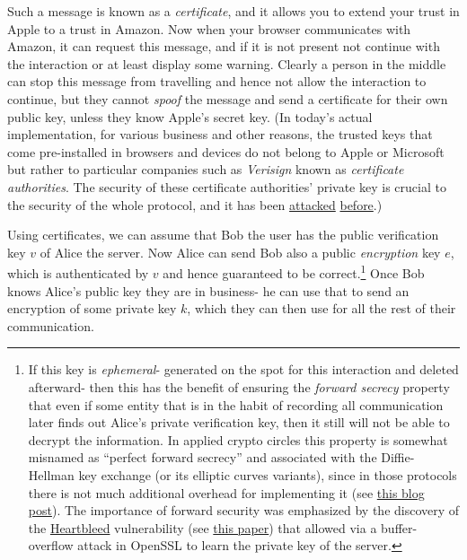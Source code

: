 Such a message is known as a \emph{certificate}, and it allows you to
extend your trust in Apple to a trust in Amazon. Now when your browser
communicates with Amazon, it can request this message, and if it is not
present not continue with the interaction or at least display some
warning. Clearly a person in the middle can stop this message from
travelling and hence not allow the interaction to continue, but they
cannot \emph{spoof} the message and send a certificate for their own
public key, unless they know Apple's secret key. (In today's actual
implementation, for various business and other reasons, the trusted keys
that come pre-installed in browsers and devices do not belong to Apple
or Microsoft but rather to particular companies such as \emph{Verisign}
known as \emph{certificate authorities}. The security of these
certificate authorities' private key is crucial to the security of the
whole protocol, and it has been
\href{https://en.wikipedia.org/wiki/DigiNotar}{attacked}
\href{http://www.wired.com/2011/10/son-of-stuxnet-in-the-wild/}{before}.)

Using certificates, we can assume that Bob the user has the public
verification key \(v\) of Alice the server. Now Alice can send Bob also
a public \emph{encryption} key \(e\), which is authenticated by \(v\)
and hence guaranteed to be correct.\footnote{If this key is
  \emph{ephemeral}- generated on the spot for this interaction and
  deleted afterward- then this has the benefit of ensuring the
  \emph{forward secrecy} property that even if some entity that is in
  the habit of recording all communication later finds out Alice's
  private verification key, then it still will not be able to decrypt
  the information. In applied crypto circles this property is somewhat
  misnamed as ``perfect forward secrecy'' and associated with the
  Diffie-Hellman key exchange (or its elliptic curves variants), since
  in those protocols there is not much additional overhead for
  implementing it (see
  \href{http://vincent.bernat.im/en/blog/2011-ssl-perfect-forward-secrecy.html}{this
  blog post}). The importance of forward security was emphasized by the
  discovery of the \href{http://heartbleed.com/}{Heartbleed}
  vulnerability (see
  \href{https://jhalderm.com/pub/papers/heartbleed-imc14.pdf}{this
  paper}) that allowed via a buffer-overflow attack in OpenSSL to learn
  the private key of the server.} Once Bob knows Alice's public key they
are in business- he can use that to send an encryption of some private
key \(k\), which they can then use for all the rest of their
communication.

